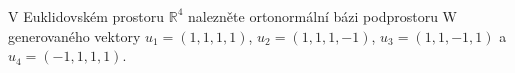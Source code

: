 \subsubsection{}
V Euklidovském prostoru $\mathbb{R}^{4}$ nalezněte ortonormální bázi podprostoru
W generovaného vektory $u_{1}=\left ( 1,1,1,1 \right )$, $u_{2}=\left ( 1,1,1,-1
\right )$, $u_{3}=\left ( 1,1,-1,1 \right )$ a $u_{4}=\left ( -1,1,1,1 \right )$.
